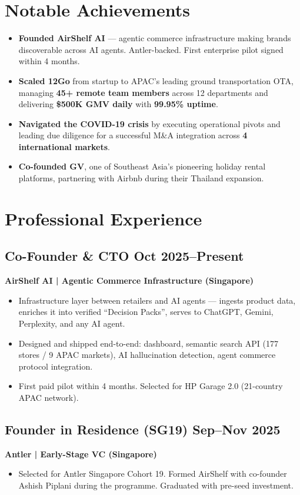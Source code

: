 \documentclass[11pt,a4paper]{article}
\begin{document}
\section*{Notable Achievements}
\begin{itemize}
    \item \textbf{Founded AirShelf AI} --- agentic commerce infrastructure making brands discoverable across AI agents. Antler-backed. First enterprise pilot signed within 4 months.
    \item \textbf{Scaled 12Go} from startup to APAC's leading ground transportation OTA, managing \textbf{45+ remote team members} across 12 departments and delivering \textbf{\$500K GMV daily} with \textbf{99.95\% uptime}.
    \item \textbf{Navigated the COVID-19 crisis} by executing operational pivots and leading due diligence for a successful M\&A integration across \textbf{4 international markets}.
    \item \textbf{Co-founded GV}, one of Southeast Asia's pioneering holiday rental platforms, partnering with Airbnb during their Thailand expansion.
\end{itemize}

\section*{Professional Experience}

\subsection*{Co-Founder \& CTO \hfill Oct 2025--Present}
\textbf{AirShelf AI | Agentic Commerce Infrastructure (Singapore)}
\begin{itemize}
    \item Infrastructure layer between retailers and AI agents --- ingests product data, enriches it into verified ``Decision Packs'', serves to ChatGPT, Gemini, Perplexity, and any AI agent.
    \item Designed and shipped end-to-end: dashboard, semantic search API (177 stores / 9 APAC markets), AI hallucination detection, agent commerce protocol integration.
    \item First paid pilot within 4 months. Selected for HP Garage 2.0 (21-country APAC network).
\end{itemize}

\subsection*{Founder in Residence (SG19) \hfill Sep--Nov 2025}
\textbf{Antler | Early-Stage VC (Singapore)}
\begin{itemize}
    \item Selected for Antler Singapore Cohort 19. Formed AirShelf with co-founder Ashish Piplani during the programme. Graduated with pre-seed investment.
\end{itemize}
\end{document}
